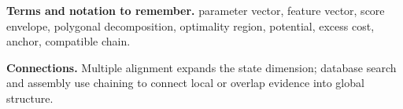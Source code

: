 \documentclass[11pt]{article}
\begin{document}
{\footnotesize
\textbf{Terms and notation to remember.} parameter vector, feature vector, score envelope, polygonal decomposition, optimality region, potential, excess cost, anchor, compatible chain.

\textbf{Connections.} Multiple alignment expands the state dimension; database search and assembly use chaining to connect local or overlap evidence into global structure.
}
\end{document}
